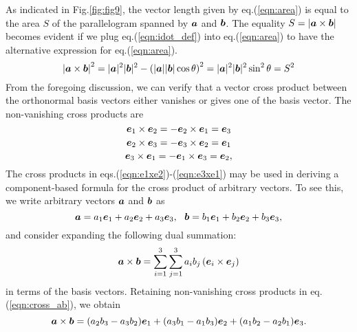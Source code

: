 \documentclass[10pt,a4j]{article}
\begin{document}
As indicated in Fig.\ref{fig:fig9}, the vector length given by eq.(\ref{eqn:area}) 
is equal to the area $S$ of the parallelogram spanned by $\mbox{\boldmath $a$}$ and $\mbox{\boldmath $b$}$. 
The equality $S=|\mbox{\boldmath $a$}\times \mbox{\boldmath $b$}|$ becomes evident if we plug 
eq.(\ref{eqn:idot_def}) into eq.(\ref{eqn:area}) to have the alternative expression 
for eq.(\ref{eqn:area}). 
\begin{equation}
    \left|\mbox{\boldmath $a$}\times \mbox{\boldmath $b$} \right|^2
    =
    |\mbox{\boldmath $a$}|^2|\mbox{\boldmath $b$}|^2-
    \left(
    |\mbox{\boldmath $a$}||\mbox{\boldmath $b$}|\cos\theta \right)^2
    = |\mbox{\boldmath $a$}|^2|\mbox{\boldmath $b$}|^2\sin^2\theta
    =S^2
    \label{eqn:}
\end{equation}
From the foregoing discussion, we can verify that a vector cross product between the orthonormal basis vectors either vanishes or gives one of the basis vector. The non-vanishing cross products are
\begin{equation}
    \mbox{\boldmath $e$}_1 \times  \mbox{\boldmath $e$}_2=
    -\mbox{\boldmath $e$}_2 \times  \mbox{\boldmath $e$}_1=
    \mbox{\boldmath $e$}_3
    \label{eqn:e1xe2}
\end{equation}
\begin{equation}
    \mbox{\boldmath $e$}_2 \times  \mbox{\boldmath $e$}_3= 
    -\mbox{\boldmath $e$}_3 \times  \mbox{\boldmath $e$}_2=\mbox{\boldmath $e$}_1
    \label{eqn:e2xe3}
\end{equation}
\begin{equation}
    \mbox{\boldmath $e$}_3 \times  \mbox{\boldmath $e$}_1
    =
    -\mbox{\boldmath $e$}_1 \times  \mbox{\boldmath $e$}_3=\mbox{\boldmath $e$}_2,
    \label{eqn:e3xe1}
\end{equation}
The cross products in eqs.(\ref{eqn:e1xe2})-(\ref{eqn:e3xe1}) may be used in deriving a component-based formula for the cross product of arbitrary vectors. To see this, we write arbitrary vectors $\mbox{\boldmath $a$}$ and $\mbox{\boldmath $b$}$ as
\begin{equation}
    \fat{a}=
    a_1\fat{e}_1 + a_2\fat{e}_2 + a_3\fat{e}_3, \ \ 
    \fat{b}=
    b_1\fat{e}_1 + b_2\fat{e}_2 + b_3\fat{e}_3,
    \label{eqn:}
\end{equation}
and consider expanding the following dual summation:
\begin{equation}
    \mbox{\boldmath $a$}\times \mbox{\boldmath $b$} = 
    \sum_{i=1}^3
    \sum_{j=1}^3
    a_ib_j \left(\mbox{\boldmath $e$}_i\times \mbox{\boldmath $e$}_j\right) 
    \label{eqn:cross_ab}
\end{equation}
in terms of the basis vectors.
Retaining non-vanishing cross products in eq.(\ref{eqn:cross_ab}), we obtain
\begin{equation}
    \mbox{\boldmath $a$}\times \mbox{\boldmath $b$} 
    =
    (a_2b_3-a_3b_2)\mbox{\boldmath $e$}_1
    +
    (a_3b_1-a_1b_3)\mbox{\boldmath $e$}_2
    +
    (a_1b_2-a_2b_1)\mbox{\boldmath $e$}_3.
    \label{eqn:cross_ab_worked}
\end{equation}
\end{document}
